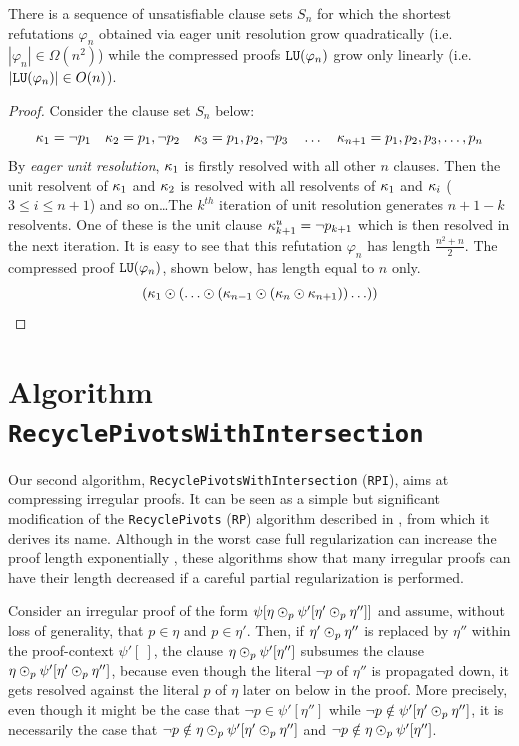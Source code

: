 \documentclass[envcountsame]{llncs}
\newcommand{\RPlong}{\texttt{Recycle\-Pivots}}
\newcommand{\RPIlong}{\texttt{Recycle\-Pivots\-With\-Intersection}}
\newcommand{\RP}{\texttt{\upshape RP}}
\newcommand{\RPI}{\texttt{\upshape RPI}}
\newcommand{\LU}{\texttt{\upshape LU}}
\begin{document}
\begin{theorem}
\label{Theorem:QuadraticCompression}
There is a sequence of unsatisfiable clause sets $S_n$ for which the
shortest refutations $\varphi_n$ obtained via eager unit resolution
grow quadratically (i.e. $|\varphi_n| \in \Omega(n^2)$) while the
compressed proofs $\LU(\varphi_n)$ grow only linearly
(i.e. $|\LU(\varphi_n)| \in O(n)$).
\end{theorem}
\begin{proof} Consider the clause set $S_n$ below:
$$
\kappa_1 = \neg p_1
\quad
\kappa_2 = p_1, \neg p_2
\quad
\kappa_3 = p_1, p_2, \neg p_3
\quad
\ldots
\quad
\kappa_{n+1} = p_1, p_2, p_3, \ldots, p_n
$$
By \emph{eager unit resolution}, $\kappa_1$ is firstly resolved with all other $n$ clauses. Then the unit resolvent of $\kappa_1$ and $\kappa_2$ is resolved with all resolvents of $\kappa_1$ and $\kappa_i$ ($3 \leq i \leq n+1$) and so on\ldots The $k^{th}$ iteration of unit resolution generates $n+1-k$ resolvents. One of these is the unit clause $\kappa^u_{k+1} = \neg p_{k+1}$ which is then resolved in the next iteration. It is easy to see that this refutation $\varphi_n$ has length
$
\frac{n^2 + n}{2}
$.
The compressed proof $\LU(\varphi_n)$, shown below, has length equal to $n$ only.
$$
(\kappa_1 \odot (\ldots \odot (\kappa_{n-1} \odot (\kappa_n \odot \kappa_{n+1}))\ldots))
$$
%
\hfill\QED
\end{proof}


\newcommand{\clause}[1]{#1.\mathit{clause}}

\section{Algorithm {\RPIlong}}
\label{Section:RPI}

Our second algorithm, {\RPIlong} ({\RPI}), aims at compressing irregular proofs. It can be seen as a simple 
but significant modification of the {\RPlong} ({\RP}) algorithm described in 
\cite{Bar-IlanFuhrmannHooryShachamStrichman2009Linear-time-reductions-of-resolution-proofs}, 
from which it derives its name. 
Although in the worst case full regularization can increase the proof length exponentially 
\cite{Tseitin1983On-The-Complexity-of-Proofs-in-Propositional-Logics}, these algorithms show that 
many irregular proofs can have their length decreased if a careful partial regularization is performed. 

Consider an irregular proof of the form $\psi[ \eta \odot_p \psi'[\eta' \odot_p \eta''] ]$ and assume, without loss of generality, that $p \in \eta$ and $p \in \eta'$. Then, if $\eta' \odot_p \eta''$ is replaced by $\eta''$ within the proof-context $\psi'[\ ]$, the clause $\eta \odot_p \psi'[\eta'']$ subsumes the clause $\eta \odot_p \psi'[\eta' \odot_p \eta'']$, because even though the literal $\neg p$ of $\eta''$ is
propagated down, it gets resolved against the literal $p$ of $\eta$ later on below in the proof. More precisely, even though it might be the case that $\neg p \in \psi'[\eta'']$ while $\neg p \notin \psi'[\eta' \odot_p \eta'']$, it is necessarily the case that $\neg p \notin \eta \odot_p \psi'[\eta' \odot_p \eta'']$ and $\neg p \notin \eta \odot_p \psi'[\eta'']$.
\end{document}

